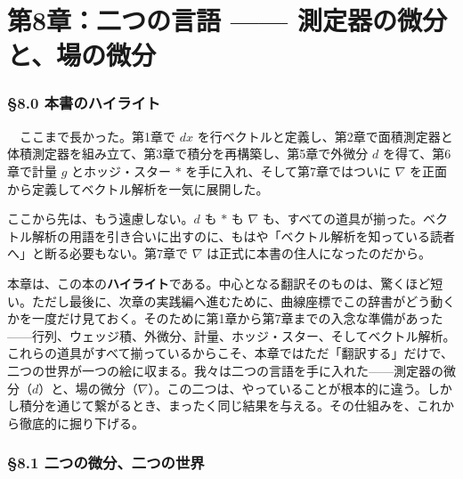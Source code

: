 \documentclass[a4paper,12pt,openany]{book}
\begin{document}
\newpage

\hypertarget{ux7b2c8ux7ae0ux4e8cux3064ux306eux8a00ux8a9e-ux6e2cux5b9aux5668ux306eux5faeux5206ux3068ux5834ux306eux5faeux5206}{%
\chapter{第8章：二つの言語 ——
測定器の微分と、場の微分}\label{ux7b2c8ux7ae0ux4e8cux3064ux306eux8a00ux8a9e-ux6e2cux5b9aux5668ux306eux5faeux5206ux3068ux5834ux306eux5faeux5206}}

\hypertarget{ux672cux66f8ux306eux30cfux30a4ux30e9ux30a4ux30c8}{%
\subsection{§8.0
本書のハイライト}\label{ux672cux66f8ux306eux30cfux30a4ux30e9ux30a4ux30c8}}

　ここまで長かった。第1章で \(dx\)
を行ベクトルと定義し、第2章で面積測定器と体積測定器を組み立て、第3章で積分を再構築し、第5章で外微分
\(d\) を得て、第6章で計量 \(g\) とホッジ・スター \(\ast\)
を手に入れ、そして第7章ではついに \(\nabla\)
を正面から定義してベクトル解析を一気に展開した。

ここから先は、もう遠慮しない。\(d\) も \(\ast\) も \(\nabla\)
も、すべての道具が揃った。ベクトル解析の用語を引き合いに出すのに、もはや「ベクトル解析を知っている読者へ」と断る必要もない。第7章で
\(\nabla\) は正式に本書の住人になったのだから。

本章は、この本の\textbf{ハイライト}である。中心となる翻訳そのものは、驚くほど短い。ただし最後に、次章の実践編へ進むために、曲線座標でこの辞書がどう動くかを一度だけ見ておく。そのために第1章から第7章までの入念な準備があった——行列、ウェッジ積、外微分、計量、ホッジ・スター、そしてベクトル解析。これらの道具がすべて揃っているからこそ、本章ではただ「翻訳する」だけで、二つの世界が一つの絵に収まる。我々は二つの言語を手に入れた——測定器の微分（\(d\)）と、場の微分（\(\nabla\)）。この二つは、やっていることが根本的に違う。しかし積分を通じて繋がるとき、まったく同じ結果を与える。その仕組みを、これから徹底的に掘り下げる。

\par\vspace{0.35em}\par

\hypertarget{ux4e8cux3064ux306eux5faeux5206ux4e8cux3064ux306eux4e16ux754c}{%
\subsection{§8.1
二つの微分、二つの世界}\label{ux4e8cux3064ux306eux5faeux5206ux4e8cux3064ux306eux4e16ux754c}}
\end{document}
